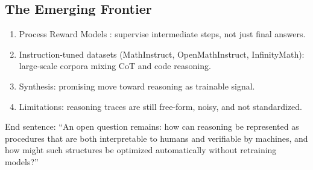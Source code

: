 \documentclass[project]{bsu-cs}  %
\begin{document}
\subsection{The Emerging Frontier}
\begin{enumerate}
    \item Process Reward Models \citep{lightman2023letsverifystepstep}: supervise intermediate steps, not just final answers.

    \item Instruction-tuned datasets (MathInstruct, OpenMathInstruct, InfinityMath): large-scale corpora mixing CoT and code reasoning.

    \item Synthesis: promising move toward reasoning as trainable signal.

    \item Limitations: reasoning traces are still free-form, noisy, and not standardized.
\end{enumerate}
End sentence: “An open question remains: how can reasoning be represented as procedures that are both interpretable to humans and verifiable by machines, and how might such structures be optimized automatically without retraining models?”
% 
%
%
% 
\end{document}
